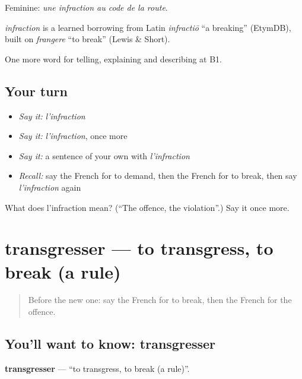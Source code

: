 Feminine: \emph{une infraction au code de la route}.

\begin{cousinweb}
\emph{infraction} is a learned borrowing from Latin \emph{infractiō} \textquotedblleft{}a breaking\textquotedblright{} (EtymDB), built on \emph{frangere} \textquotedblleft{}to break\textquotedblright{} (Lewis \& Short).
\end{cousinweb}

\begin{grammarlens}[title={What you've built}]
One more word for telling, explaining and describing at B1.
\end{grammarlens}

\subsection*{Your turn}
\begin{itemize}
\raggedright
  \item \emph{Say it:} \emph{l'infraction}
  \item \emph{Say it:} \emph{l'infraction}, once more
  \item \emph{Say it:} a sentence of your own with \emph{l'infraction}
  \item \emph{Recall:} say the French for to demand, then the French for to break, then say \emph{l'infraction} again
\end{itemize}

\begin{tcolorbox}[breakable,colback=teal!4,colframe=teal!35!black,title={Before you move on}]
What does l'infraction mean? (\textquotedblleft{}The offence, the violation\textquotedblright{}.) Say it once more.
\end{tcolorbox}
\section[transgresser]{transgresser — to transgress, to break (a rule)}

\label{lesson:FR-C382-transgresser}



\begin{quote}
Before the new one: say the French for to break, then the French for the offence.
\end{quote}

\subsection*{You'll want to know: transgresser}
\textbf{transgresser} — \textquotedblleft{}to transgress, to break (a rule)\textquotedblright{}.

